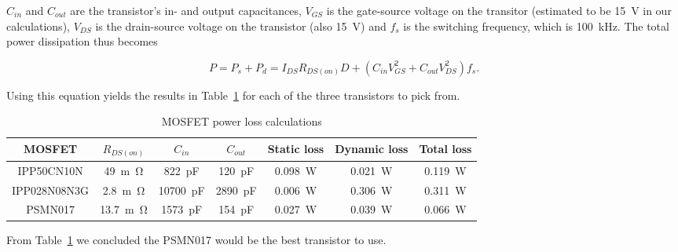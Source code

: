\documentclass[11pt,titlepage]{report}
\begin{document}
$C_{in}$ and $C_{out}$ are the transistor's in- and output capacitances, $V_{GS}$ is the gate-source voltage on the transitor (estimated to be \SI{15}{V} in our calculations), $V_{DS}$ is the drain-source voltage on the transistor (also \SI{15}{V}) and $f_{s}$ is the switching frequency, which is \SI{100}{kHz}.
The total power dissipation thus becomes

\begin{equation}
P = P_{s} + P_{d} = I_{DS}R_{DS(on)}D + (C_{in}V_{GS}^2 + C_{out}V_{DS}^2)f_{s} .
\end{equation}

Using this equation yields the results in Table~\ref{tab:ass1-power-loss} for each of the three transistors to pick from.

\begin{table}[H]
	\centering
	\caption{MOSFET power loss calculations}
	\label{tab:ass1-power-loss}
	\begin{tabular}{c c c c c c c}
		\hline\hline
		MOSFET & $R_{DS(on)}$ & $C_{in}$ & $C_{out}$ & Static loss & Dynamic loss & Total loss \\
		\hline
		IPP50CN10N & \SI{49}{m\ohm} & \SI{822}{pF} & \SI{120}{pF} & \SI{0.098}{W} & \SI{0.021}{W} & \SI{0.119}{W} \\
		IPP028N08N3G & \SI{2.8}{m\ohm} & \SI{10700}{pF} & \SI{2890}{pF} & \SI{0.006}{W} & \SI{0.306}{W} & \SI{0.311}{W} \\
		PSMN017 & \SI{13.7}{m\ohm} & \SI{1573}{pF} & \SI{154}{pF} & \SI{0.027}{W} & \SI{0.039}{W} & \SI{0.066}{W} \\
		\hline
		\end{tabular}
\end{table}

From Table~\ref{tab:ass1-power-loss} we concluded the PSMN017 would be the best transistor to use.
 
\end{document}
